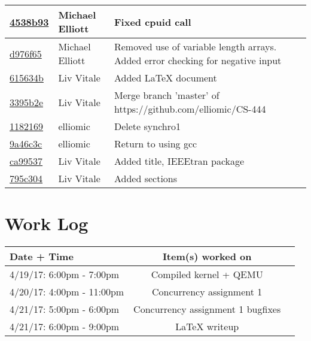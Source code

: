 \documentclass[letterpaper,10pt,titlepage,draftclsnofoot,onecolumn]{IEEEtran}
\begin{document}
\begin{tabular}{l l l}
\href{https://github.com/elliomic/CS-444/commit/4538b939bed2cc80ab0b8940c419877d51f693bc}{4538b93} & Michael Elliott & Fixed cpuid call\\\hline
\href{https://github.com/elliomic/CS-444/commit/d976f657bc72165f444aac68eeecfdda2d2e1afe}{d976f65} & Michael Elliott & Removed use of variable length arrays. Added error checking for negative input\\\hline
\href{https://github.com/elliomic/CS-444/commit/615634bdd2be122c6401c6c7ccf23e457ca09c84}{615634b} & Liv Vitale & Added LaTeX document\\\hline
\href{https://github.com/elliomic/CS-444/commit/3395b2e4d682283838e8cb97063e5517bb5b5d30}{3395b2e} & Liv Vitale & Merge branch 'master' of https://github.com/elliomic/CS-444\\\hline
\href{https://github.com/elliomic/CS-444/commit/1182169eca1f04759352581b206d7715f24499ca}{1182169} & elliomic & Delete synchro1\\\hline
\href{https://github.com/elliomic/CS-444/commit/9a46c3c9bab82e9618cddc3e1ddca4f4e3ae0765}{9a46c3c} & elliomic & Return to using gcc\\\hline
\href{https://github.com/elliomic/CS-444/commit/ca99537566dcc4c0aa6cac3e045d5fefad09dd46}{ca99537} & Liv Vitale & Added title, IEEEtran package\\\hline
\href{https://github.com/elliomic/CS-444/commit/795c3046ccb4c7bab06b6d779d74d179c68776d6}{795c304} & Liv Vitale & Added sections\\\hline\end{tabular}


\section{Work Log}
\begin{tabular}{l | c | r}
Date + Time & Item(s) worked on \\
\hline
4/19/17: 6:00pm - 7:00pm & Compiled kernel + QEMU \\
4/20/17: 4:00pm - 11:00pm & Concurrency assignment 1 \\
4/21/17: 5:00pm - 6:00pm & Concurrency assignment 1 bugfixes \\
4/21/17: 6:00pm - 9:00pm & LaTeX writeup \\
\end{tabular}

\nocite{*}



\end{document}
